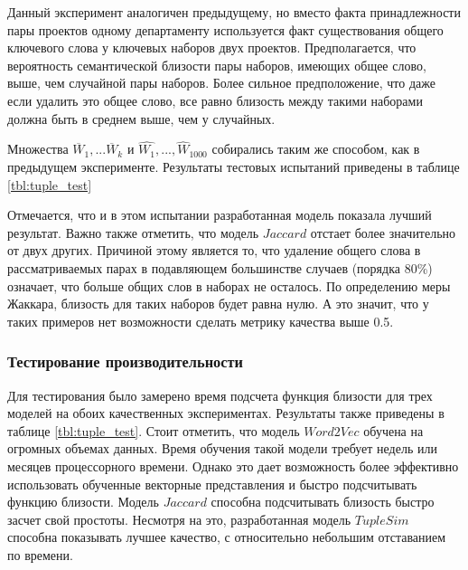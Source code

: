 Данный эксперимент аналогичен предыдущему, но вместо факта принадлежности пары проектов одному департаменту используется факт существования общего ключевого слова у ключевых наборов двух проектов. Предполагается, что вероятность семантической близости пары наборов, имеющих общее слово, выше, чем случайной пары наборов. Более сильное предположение, что даже если удалить это общее слово, все равно близость между такими наборами должна быть в среднем выше, чем у случайных.

Множества $\overline{W}_{1}, ... \overline{W}_{k}$ и $\hat{W_1}, ..., \hat{W}_{1000}$ собирались таким же способом, как в предыдущем эксперименте. Результаты тестовых испытаний приведены в таблице \ref{tbl:tuple_test}

Отмечается, что и в этом испытании разработанная модель показала лучший результат. Важно также отметить, что модель $Jaccard$ отстает более значительно от двух других. Причиной этому является то, что удаление общего слова в рассматриваемых парах в подавляющем большинстве случаев (порядка 80\%) означает, что больше общих слов в наборах не осталось. По определению меры Жаккара, близость для таких наборов будет равна нулю. А это значит, что у таких примеров нет возможности сделать метрику качества выше 0.5.

\subsubsection{Тестирование производительности}
Для тестирования было замерено время подсчета функция близости для трех моделей на обоих качественных экспериментах. Результаты также приведены в таблице \ref{tbl:tuple_test}. Стоит отметить, что модель $Word2Vec$ обучена на огромных объемах данных. Время обучения такой модели требует недель или месяцев процессорного времени. Однако это дает возможность более эффективно использовать обученные векторные представления и быстро подсчитывать функцию близости. Модель $Jaccard$ способна подсчитывать близость быстро засчет свой простоты. Несмотря на это, разработанная модель $TupleSim$ способна показывать лучшее качество, с относительно небольшим отставанием по времени.

